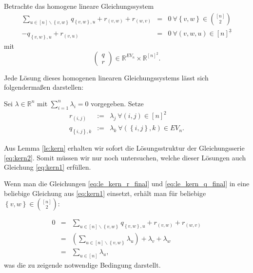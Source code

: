 \documentclass[10p,a4paper,BCOR = 12mm, DIV=15]{scrbook}
\begin{document}
{\begin{Kor}
\label{kor:kern}
Betrachte das homogene lineare Gleichungssystem
\begin{eqnarray}
\sum_{u\in[n]\backslash\left\{v, w\right\}} q_{\left\{v, w\right\}, u} + r_{\left(v, w\right)} + r_{\left(w, v\right)}& = & 0\ \forall \left\{v, w\right\}\in {[n] \choose 2} \label{eq:kern1} \\
-q_{\left\{v, w\right\}, u} + r_{\left(v, u\right)} & = & 0\ \forall \left(v, w, u\right)\in [n]^{\underline{3}} \label{eq:kern2}
\end{eqnarray}
mit
\begin{displaymath}
\left(\begin{array}{c}
q \\
r
\end{array}\right) \in \mathbb{R}^{EV_n}\times \mathbb{R}^{[n]^{\underline{2}}}.
\end{displaymath}

Jede Lösung dieses homogenen linearen Gleichungssystems lässt sich folgendermaßen darstellen:

Sei $\lambda\in\mathbb{R}^n$ mit $\sum_{i=1}^n \lambda_i = 0$ vorgegeben. Setze
\begin{eqnarray*}
r_{\left(i, j\right)} & := & \lambda_j\ \forall \left(i, j\right)\in\left[n\right]^2 \\
q_{\left\{i, j\right\},k} & := & \lambda_k\ \forall \left(\left\{i, j\right\}, k\right)\in EV_n.
\end{eqnarray*}
\end{Kor}
\begin{bew}
Aus Lemma \ref{le:kern} erhalten wir sofort die Lösungsstruktur der Gleichungsserie \eqref{eq:kern2}. Somit müssen wir nur noch untersuchen, welche dieser Lösungen auch Gleichung \eqref{eq:kern1} erfüllen.

Wenn man die Gleichungen \eqref{eq:le_kern_r_final} und \eqref{eq:le_kern_q_final} in eine beliebige Gleichung aus \eqref{eq:kern1} einsetzt, erhält man für beliebige $\left\{v, w\right\}\in {[n] \choose 2}$:

\begin{eqnarray*}
0 & = & \sum_{u\in[n]\backslash\left\{v, w\right\}} q_{\left\{v, w\right\}, u} + r_{\left(v, w\right)} + r_{\left(w, 
v\right)} \\
& = & \left(\sum_{u\in[n]\backslash\left\{v, w\right\}} \lambda_u\right) + \lambda_v + \lambda_w \\
& = & \sum_{u\in[n]} \lambda_u,
\end{eqnarray*}
was die zu zeigende notwendige Bedingung darstellt.
\end{bew}

}
\end{document}
